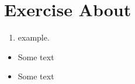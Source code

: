 \section[\texorpdfstring{Exercise About BibTeX}{Exercise About \BibTeX{}}]{Exercise About \BibTeX{}}

\setlength\itemsep{-0.5em} %
\itemsep{-0.5em} %

\begin{enumerate}[topsep=-0.1em,itemsep=-0.3em]
    \item example.
\end{enumerate}

\begin{itemize}[topsep=8pt,itemsep=4pt,partopsep=4pt, parsep=4pt] %
    \item Some text
    \item Some text
\end{itemize}

